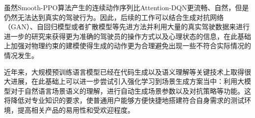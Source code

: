 虽然Smooth-PPO算法产生的连续动作序列比Attention-DQN更流畅、自然，但是仍然无法达到真实的驾驶行为。因此，后续的工作可以结合生成对抗网络（GAN）、自回归模型或者扩散模型等先进方法并利用大量的真实驾驶数据来进行进一步的研究来获得更为准确的驾驶员的操作方式以及心理状态的信息，在此基础上加强对物理约束的建模使得生成的动作更为合理避免出现一些不符合实际情况的情况发生。

近年来，大规模预训练语言模型已经在代码生成以及语义理解等关键技术上取得很大进展，在此基础上可以进一步尝试引入强化学习到场景生成方案当中：利用大模型对于自然语言场景语义的理解，进行自动生成场景参数以及对抗策略等功能。这将降低对专业知识的要求，使普通用户能够方便快捷地搭建符合自身需求的测试环境，提高相关产品的易用性和受欢迎程度。







\newpage
